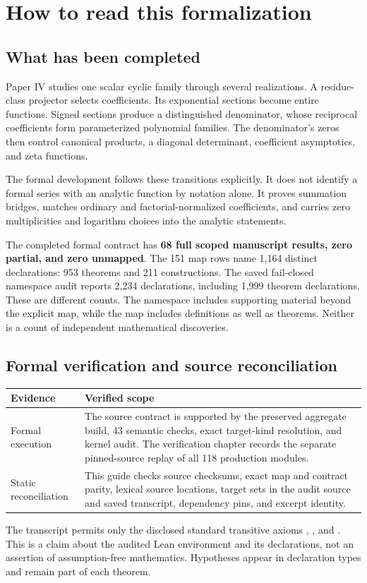 \section{How to read this formalization}
\subsection{What has been completed}
Paper IV studies one scalar cyclic family through several realizations. A residue-class projector selects coefficients. Its exponential sections become entire functions. Signed sections produce a distinguished denominator, whose reciprocal coefficients form parameterized polynomial families. The denominator's zeros then control canonical products, a diagonal determinant, coefficient asymptotics, and zeta functions.

The formal development follows these transitions explicitly. It does not identify a formal series with an analytic function by notation alone. It proves summation bridges, matches ordinary and factorial-normalized coefficients, and carries zero multiplicities and logarithm choices into the analytic statements.

The completed formal contract has \textbf{68 full scoped manuscript results, zero partial, and zero unmapped}. The 151 map rows name 1,164 distinct declarations: 953 theorems and 211 constructions. The saved fail-closed namespace audit reports 2,234 declarations, including 1,999 theorem declarations. These are different counts. The namespace includes supporting material beyond the explicit map, while the map includes definitions as well as theorems. Neither is a count of independent mathematical discoveries.

\subsection{Formal verification and source reconciliation}
\begin{longtable}{p{}p{}}
\toprule Evidence & Verified scope \\ \midrule\endhead
Formal execution & The source contract is supported by the preserved aggregate build, 43 semantic checks, exact target-kind resolution, and kernel audit. The verification chapter records the separate pinned-source replay of all 118 production modules. \\
Static reconciliation & This guide checks source checksums, exact map and contract parity, lexical source locations, target sets in the audit source and saved transcript, dependency pins, and excerpt identity. \\

\bottomrule
\end{longtable}
The transcript permits only the disclosed standard transitive axioms , , and . This is a claim about the audited Lean environment and its declarations, not an assertion of assumption-free mathematics. Hypotheses appear in declaration types and remain part of each theorem.

